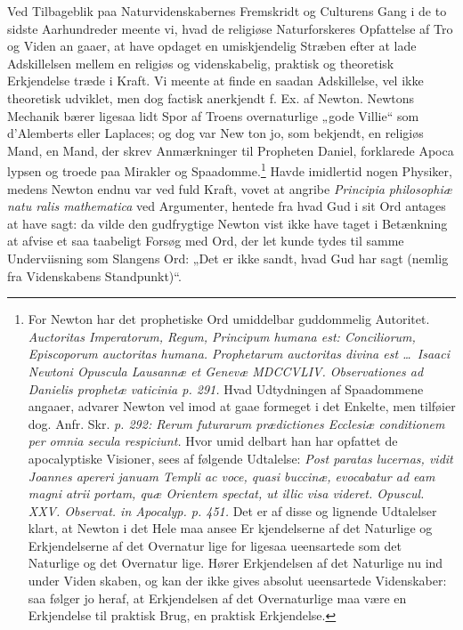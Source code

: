 \documentclass[12pt]{book}
\newcommand{\opage}[1]{\marginnote{\footnotesize\textit{[#1]}}}
\begin{document}
Ved Tilbageblik paa Naturvidenskabernes Fremskridt og
Culturens Gang i de to sidste Aarhundreder meente vi, hvad
de religiøse Naturforskeres Opfattelse af Tro og Viden an\-%
gaaer, at have opdaget en umiskjendelig Stræben efter at
lade Adskillelsen mellem en religiøs og videnskabelig, praktisk
og theoretisk Erkjendelse træde i Kraft. Vi meente at finde
en saadan Adskillelse, vel ikke theoretisk udviklet, men dog
factisk anerkjendt f. Ex. af Newton. Newtons Mechanik
bærer ligesaa lidt Spor af Troens overnaturlige „gode
Villie“ som d'Alemberts eller Laplaces; og dog var New\-%
ton jo, som bekjendt, en religiøs Mand, en Mand, der
skrev Anmærkninger til Propheten Daniel, forklarede Apoca\-%
lypsen og troede paa Mirakler og Spaadomme.\footnote{For Newton har det prophetiske Ord umiddelbar guddommelig
Autoritet. \textit{Auctoritas Imperatorum, Regum, Principum humana
est: Conciliorum, Episcoporum auctoritas humana. Prophetarum
auctoritas divina est \dots\ Isaaci Newtoni Opuscula Lausannæ et
Genevæ MDCCVLIV. Observationes ad Danielis prophetæ
vaticinia p. 291.} %
Hvad Udtydningen af Spaadommene angaaer,
advarer Newton vel imod at gaae formeget i det Enkelte, men
tilføier dog. Anfr. Skr. \textit{p. 292: Rerum futurarum prædictiones
Ecclesiæ conditionem per omnia secula respiciunt.} Hvor umid\-%
delbart han har opfattet de apocalyptiske Visioner, sees af følgende
Udtalelse: \textit{Post paratas lucernas, vidit Joannes apereri januam
Templi ac voce, quasi buccinæ, evocabatur ad eam magni atrii
portam, quæ Orientem spectat, ut illic visa videret. Opuscul.
XXV. Observat. in Apocalyp. p. 451.} Det er af disse og
lignende Udtalelser klart, at Newton i det Hele maa ansee Er\-%
kjendelserne af det Naturlige og Erkjendelserne af det Overnatur\-%
lige for ligesaa ueensartede som det Naturlige og det Overnatur\-%
lige. Hører Erkjendelsen af det Naturlige nu ind under Viden\-%
skaben, og kan der ikke gives absolut ueensartede Videnskaber: saa
følger jo heraf, at Erkjendelsen af det Overnaturlige maa være en
Erkjendelse til praktisk Brug, en praktisk Erkjendelse.} Havde
\opage{26}\setcounter{footnote}{0}%
imidlertid nogen Physiker, medens Newton endnu var ved
fuld Kraft, vovet at angribe \textit{Principia philosophiæ natu\-%
ralis mathematica} ved Argumenter, hentede fra hvad Gud
i sit Ord antages at have sagt: da vilde den gudfrygtige
Newton vist ikke have taget i Betænkning at afvise et saa
taabeligt Forsøg med Ord, der let kunde tydes til samme
Underviisning som Slangens Ord: „Det er ikke sandt, hvad
Gud har sagt (nemlig fra Videnskabens Standpunkt)“.
\end{document}

